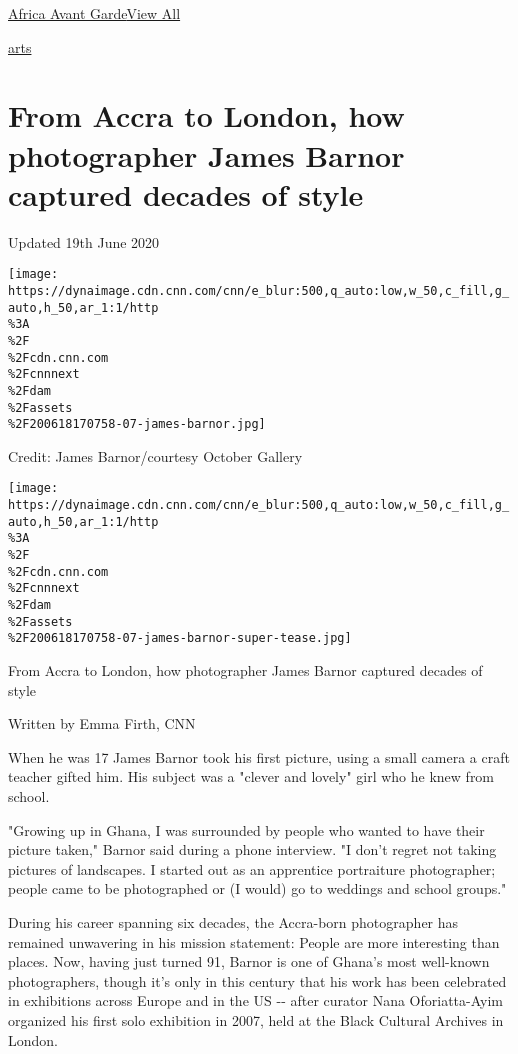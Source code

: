 \href{/}{}\href{/style}{}

\href{/style/specials/africa-avant-garde}{Africa Avant
Garde}\href{/style/specials/africa-avant-garde}{View All}

\href{/style/arts}{arts}

\hypertarget{from-accra-to-london-how-photographer-james-barnor-captured-decades-of-style}{%
\section{From Accra to London, how photographer James Barnor captured
decades of
style}\label{from-accra-to-london-how-photographer-james-barnor-captured-decades-of-style}}

Updated 19th June 2020

\texttt{[image: https://dynaimage.cdn.cnn.com/cnn/e\_blur:500,q\_auto:low,w\_50,c\_fill,g\_auto,h\_50,ar\_1:1/http\\\%3A\\\%2F\\\%2Fcdn.cnn.com\\\%2Fcnnnext\\\%2Fdam\\\%2Fassets\\\%2F200618170758-07-james-barnor.jpg]}

Credit: James Barnor/courtesy October Gallery

\texttt{[image: https://dynaimage.cdn.cnn.com/cnn/e\_blur:500,q\_auto:low,w\_50,c\_fill,g\_auto,h\_50,ar\_1:1/http\\\%3A\\\%2F\\\%2Fcdn.cnn.com\\\%2Fcnnnext\\\%2Fdam\\\%2Fassets\\\%2F200618170758-07-james-barnor-super-tease.jpg]}

From Accra to London, how photographer James Barnor captured decades of
style

Written by Emma Firth, CNN

When he was 17 James Barnor took his first picture, using a small camera
a craft teacher gifted him. His subject was a "clever and lovely" girl
who he knew from school.

"Growing up in Ghana, I was surrounded by people who wanted to have
their picture taken," Barnor said during a phone interview. "I don't
regret not taking pictures of landscapes. I started out as an apprentice
portraiture photographer; people came to be photographed or (I would) go
to weddings and school groups."

During his career spanning six decades, the Accra-born photographer has
remained unwavering in his mission statement: People are more
interesting than places. Now, having just turned 91, Barnor is one of
Ghana's most well-known photographers, though it's only in this century
that his work has been celebrated in exhibitions across Europe and in
the US -\/- after curator Nana Oforiatta-Ayim organized his first solo
exhibition in 2007, held at the Black Cultural Archives in London.

